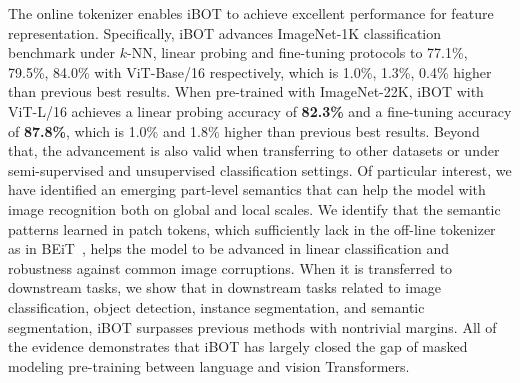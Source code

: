 \documentclass{article} %
\newcommand{\kt}[1]{\textcolor{blue}{#1}}
\def\ourmethod{{iBOT}\xspace}
\begin{document}

The online tokenizer enables \ourmethod to achieve excellent performance for feature representation. Specifically, \ourmethod advances ImageNet-1K classification benchmark under $k$-NN, linear probing and fine-tuning protocols to 77.1\%, 79.5\%, 84.0\% with ViT-Base/16 respectively, which is 1.0\%, 1.3\%, 0.4\% higher than previous best results. 
When pre-trained with ImageNet-22K, \ourmethod with ViT-L/16 achieves a linear probing accuracy of \textbf{82.3\%} and a fine-tuning accuracy of \textbf{87.8\%}, which is 1.0\% and 1.8\% higher than previous best results.
Beyond that, the advancement is also valid when transferring to other datasets or under semi-supervised and unsupervised classification settings. 
Of particular interest, we have identified an emerging part-level semantics that can help the model with image recognition both on global and local scales.
We identify that the semantic patterns learned in patch tokens, which sufficiently lack in the off-line tokenizer as in BEiT~\citep{beit}, helps the model to be advanced in linear classification and robustness against common image corruptions.
When it is transferred to downstream tasks, we show that in downstream tasks related to image classification, object detection, instance segmentation, and semantic segmentation, \ourmethod surpasses previous methods with nontrivial margins.
All of the evidence demonstrates that \ourmethod has largely closed the gap of masked modeling pre-training between language and vision Transformers.
\end{document}
